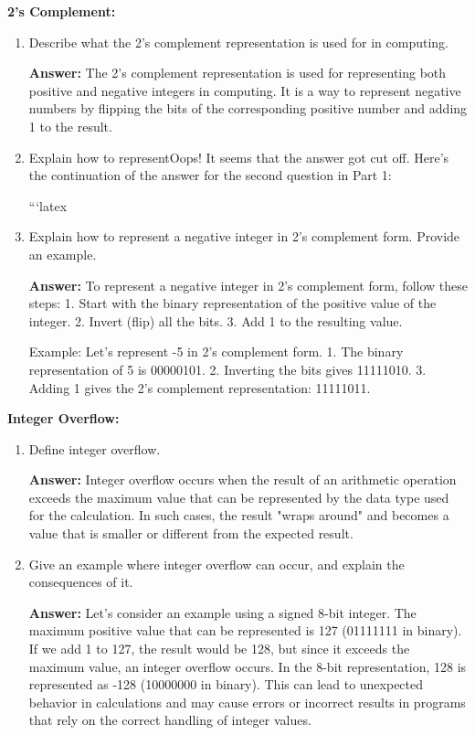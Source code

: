 \documentclass{article}
\begin{document}
\textbf{2's Complement:}
\begin{enumerate}
    \item Describe what the 2's complement representation is used for in computing.
    
    \textbf{Answer:}
    The 2's complement representation is used for representing both positive and negative integers in computing. It is a way to represent negative numbers by flipping the bits of the corresponding positive number and adding 1 to the result.
    
    \item Explain how to representOops! It seems that the answer got cut off. Here's the continuation of the answer for the second question in Part 1:

```latex
    \item Explain how to represent a negative integer in 2's complement form. Provide an example.
    
    \textbf{Answer:}
    To represent a negative integer in 2's complement form, follow these steps:
    1. Start with the binary representation of the positive value of the integer.
    2. Invert (flip) all the bits.
    3. Add 1 to the resulting value.
    
    Example:
    Let's represent -5 in 2's complement form.
    1. The binary representation of 5 is 00000101.
    2. Inverting the bits gives 11111010.
    3. Adding 1 gives the 2's complement representation: 11111011.

\end{enumerate}

\textbf{Integer Overflow:}
\begin{enumerate}
    \item Define integer overflow.
    
    \textbf{Answer:}
    Integer overflow occurs when the result of an arithmetic operation exceeds the maximum value that can be represented by the data type used for the calculation. In such cases, the result "wraps around" and becomes a value that is smaller or different from the expected result.
    
    \item Give an example where integer overflow can occur, and explain the consequences of it.
    
    \textbf{Answer:}
    Let's consider an example using a signed 8-bit integer. The maximum positive value that can be represented is 127 (01111111 in binary). If we add 1 to 127, the result would be 128, but since it exceeds the maximum value, an integer overflow occurs. In the 8-bit representation, 128 is represented as -128 (10000000 in binary). This can lead to unexpected behavior in calculations and may cause errors or incorrect results in programs that rely on the correct handling of integer values.
    
\end{enumerate}
\end{document}
